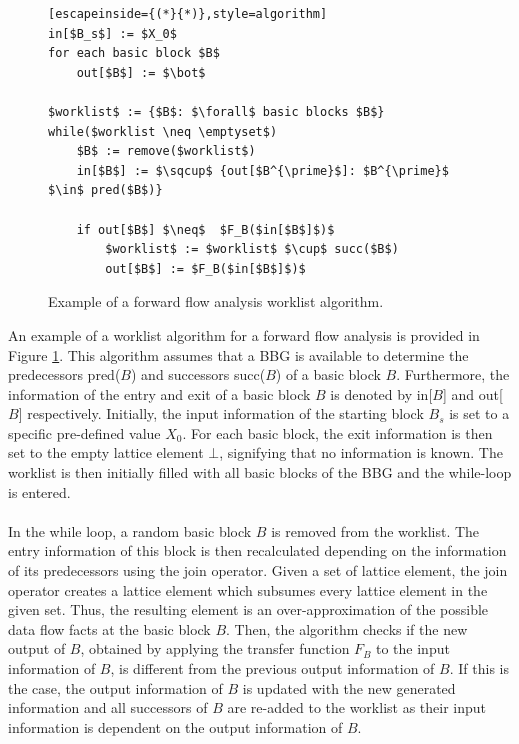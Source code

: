 \documentclass{kththesis}
\begin{document}
\clearpage
\begin{figure}[t]
    \centering
\begin{algorithmFrame}
\begin{lstlisting}[escapeinside={(*}{*)},style=algorithm]
in[$B_s$] := $X_0$
for each basic block $B$
    out[$B$] := $\bot$
    
$worklist$ := {$B$: $\forall$ basic blocks $B$}
while($worklist \neq \emptyset$)
    $B$ := remove($worklist$)
    in[$B$] := $\sqcup$ {out[$B^{\prime}$]: $B^{\prime}$ $\in$ pred($B$)}
    
    if out[$B$] $\neq$  $F_B($in[$B$]$)$
        $worklist$ := $worklist$ $\cup$ succ($B$)
        out[$B$] := $F_B($in[$B$]$)$
\end{lstlisting}
\end{algorithmFrame}
\caption[Example of a forward flow analysis worklist algorithm.]{Example of a forward flow analysis worklist algorithm.}
    \label{fig:WorklistAlgo}
\end{figure}
\noindent
An example of a worklist algorithm for a forward flow analysis is provided in Figure \ref{fig:WorklistAlgo}. This algorithm assumes that a BBG is available to determine the predecessors pred($B$) and successors succ($B$) of a basic block $B$. Furthermore, the information of the entry and exit of a basic block $B$ is denoted by in[$B$] and out[$B$] respectively. Initially, the input information of the starting block $B_s$ is set to a specific pre-defined value $X_0$. For each basic block, the exit information is then set to the empty lattice element $\bot$, signifying that no information is known. The worklist is then initially filled with all basic blocks of the BBG and the while-loop is entered.
\\ \\
In the while loop, a random basic block $B$ is removed from the worklist. The entry information of this block is then recalculated depending on the information of its predecessors using the join operator. Given a set of lattice element, the join operator creates a lattice element which subsumes every lattice element in the given set. Thus, the resulting element is an over-approximation of the possible data flow facts at the basic block $B$. Then, the algorithm checks if the new output of $B$, obtained by applying the transfer function $F_B$ to the input information of $B$, is different from the previous output information of $B$. If this is the case, the output information of $B$ is updated with the new generated information and all successors of $B$ are re-added to the worklist as their input information is dependent on the output information of $B$.
\end{document}
